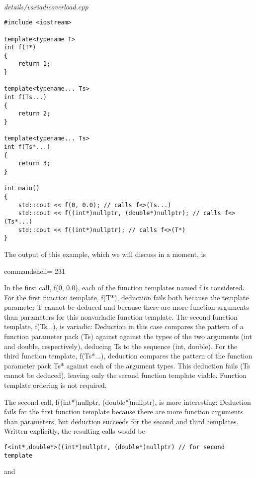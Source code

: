 \hspace*{\fill} \\ %
\noindent
\textit{details/variadicoverload.cpp}
\begin{lstlisting}[style=styleCXX]
#include <iostream>

template<typename T>
int f(T*)
{
	return 1;
}

template<typename... Ts>
int f(Ts...)
{
	return 2;
}

template<typename... Ts>
int f(Ts*...)
{
	return 3;
}

int main()
{
	std::cout << f(0, 0.0); // calls f<>(Ts...)
	std::cout << f((int*)nullptr, (double*)nullptr); // calls f<>(Ts*...)
	std::cout << f((int*)nullptr); // calls f<>(T*)
}
\end{lstlisting}

The output of this example, which we will discuss in a moment, is

\begin{tcblisting}{commandshell={}}
231
\end{tcblisting}

In the first call, f(0, 0.0), each of the function templates named f is considered. For the first function template, f(T*), deduction fails both because the template parameter T cannot be deduced and because there are more function arguments than parameters for this nonvariadic function template. The second function template, f(Ts...), is variadic: Deduction in this case compares the pattern of a function parameter pack (Ts) against against the types of the two arguments (int and double, respectively), deducing Ts to the sequence (int, double). For the third function template, f(Ts*...), deduction compares the pattern of the function parameter pack Ts* against each of the argument types. This deduction fails (Ts cannot be deduced), leaving only the second function template viable. Function template ordering is not required.

The second call, f((int*)nullptr, (double*)nullptr), is more interesting: Deduction fails for the first function template because there are more function arguments than parameters, but deduction succeeds for the second and third templates. Written explicitly, the resulting calls would be

\begin{lstlisting}[style=styleCXX]
f<int*,double*>((int*)nullptr, (double*)nullptr) // for second template
\end{lstlisting}

and

